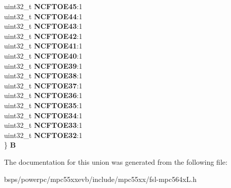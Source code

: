 \begin{DoxyCompactItemize}
\begin{tabbing}
\>uint32\_t {\bfseries NCFTOE45}:1\\
\>uint32\_t {\bfseries NCFTOE44}:1\\
\>uint32\_t {\bfseries NCFTOE43}:1\\
\>uint32\_t {\bfseries NCFTOE42}:1\\
\>uint32\_t {\bfseries NCFTOE41}:1\\
\>uint32\_t {\bfseries NCFTOE40}:1\\
\>uint32\_t {\bfseries NCFTOE39}:1\\
\>uint32\_t {\bfseries NCFTOE38}:1\\
\>uint32\_t {\bfseries NCFTOE37}:1\\
\>uint32\_t {\bfseries NCFTOE36}:1\\
\>uint32\_t {\bfseries NCFTOE35}:1\\
\>uint32\_t {\bfseries NCFTOE34}:1\\
\>uint32\_t {\bfseries NCFTOE33}:1\\
\>uint32\_t {\bfseries NCFTOE32}:1\\
\} {\bfseries B}\\

\end{tabbing}\end{DoxyCompactItemize}


The documentation for this union was generated from the following file\+:\begin{DoxyCompactItemize}
\item 
bsps/powerpc/mpc55xxevb/include/mpc55xx/fsl-\/mpc564x\+L.\+h\end{DoxyCompactItemize}

